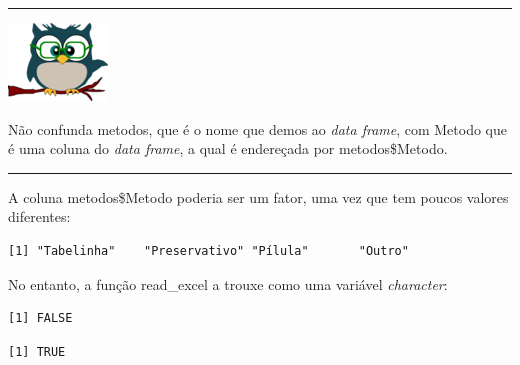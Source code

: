 \documentclass[
]{article}
\newenvironment{Shaded}{\begin{snugshade}}{\end{snugshade}}
\newcommand{\FunctionTok}[1]{\textcolor[rgb]{0.00,0.00,0.00}{#1}}
\newcommand{\NormalTok}[1]{#1}
\newcommand{\SpecialCharTok}[1]{\textcolor[rgb]{0.00,0.00,0.00}{#1}}
\begin{document}
\begin{center}\rule{0.5\linewidth}{0.5pt}\end{center}

\begin{flushleft}\includegraphics[width=0.08\linewidth]{coruja} \end{flushleft}

Não confunda metodos, que é o nome que demos ao \emph{data frame}, com
Metodo que é uma coluna do \emph{data frame}, a qual é endereçada por
metodos\$Metodo.

\begin{center}\rule{0.5\linewidth}{0.5pt}\end{center}

A coluna metodos\$Metodo poderia ser um fator, uma vez que tem poucos
valores diferentes:

\begin{Shaded}
\end{Shaded}

\begin{verbatim}
[1] "Tabelinha"    "Preservativo" "Pílula"       "Outro"       
\end{verbatim}

No entanto, a função read\_excel a trouxe como uma variável
\emph{character}:

\begin{Shaded}
\end{Shaded}

\begin{verbatim}
[1] FALSE
\end{verbatim}

\begin{Shaded}
\end{Shaded}

\begin{verbatim}
[1] TRUE
\end{verbatim}
\end{document}
